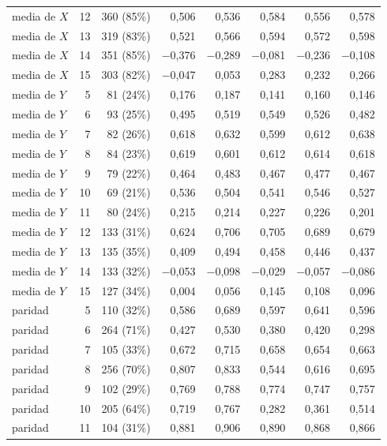 \begin{table}[htbp]
{\begin{tabular}{@{}lrrrrrrr@{}}
        media de $X$ & 12 & 360 (85\%) & 0,506 & 0,536 & 0,584 & 0,556 & 0,578 \\
        media de $X$ & 13 & 319 (83\%) & 0,521 & 0,566 & 0,594 & 0,572 & 0,598 \\
        media de $X$ & 14 & 351 (85\%) & $-$0,376 & $-$0,289 & $-$0,081 & $-$0,236 & $-$0,108 \\
        media de $X$ & 15 & 303 (82\%) & $-$0,047 & 0,053 & 0,283 & 0,232 & 0,266 \\
        media de $Y$ & 5 & 81 (24\%) & 0,176 & 0,187 & 0,141 & 0,160 & 0,146 \\
        media de $Y$ & 6 & 93 (25\%) & 0,495 & 0,519 & 0,549 & 0,526 & 0,482 \\
        media de $Y$ & 7 & 82 (26\%) & 0,618 & 0,632 & 0,599 & 0,612 & 0,638 \\
        media de $Y$ & 8 & 84 (23\%) & 0,619 & 0,601 & 0,612 & 0,614 & 0,618 \\
        media de $Y$ & 9 & 79 (22\%) & 0,464 & 0,483 & 0,467 & 0,477 & 0,467 \\
        media de $Y$ & 10 & 69 (21\%) & 0,536 & 0,504 & 0,541 & 0,546 & 0,527 \\
        media de $Y$ & 11 & 80 (24\%) & 0,215 & 0,214 & 0,227 & 0,226 & 0,201 \\
        media de $Y$ & 12 & 133 (31\%) & 0,624 & 0,706 & 0,705 & 0,689 & 0,679 \\
        media de $Y$ & 13 & 135 (35\%) & 0,409 & 0,494 & 0,458 & 0,446 & 0,437 \\
        media de $Y$ & 14 & 133 (32\%) & $-$0,053 & $-$0,098 & $-$0,029 & $-$0,057 & $-$0,086 \\
        media de $Y$ & 15 & 127 (34\%) & 0,004 & 0,056 & 0,145 & 0,108 & 0,096 \\
        paridad & 5 & 110 (32\%) & 0,586 & 0,689 & 0,597 & 0,641 & 0,596 \\
        paridad & 6 & 264 (71\%) & 0,427 & 0,530 & 0,380 & 0,420 & 0,298 \\
        paridad & 7 & 105 (33\%) & 0,672 & 0,715 & 0,658 & 0,654 & 0,663 \\
        paridad & 8 & 256 (70\%) & 0,807 & 0,833 & 0,544 & 0,616 & 0,695 \\
        paridad & 9 & 102 (29\%) & 0,769 & 0,788 & 0,774 & 0,747 & 0,757 \\
        paridad & 10 & 205 (64\%) & 0,719 & 0,767 & 0,282 & 0,361 & 0,514 \\
        paridad & 11 & 104 (31\%) & 0,881 & 0,906 & 0,890 & 0,868 & 0,866 \\

\end{tabular}}
\end{table}
